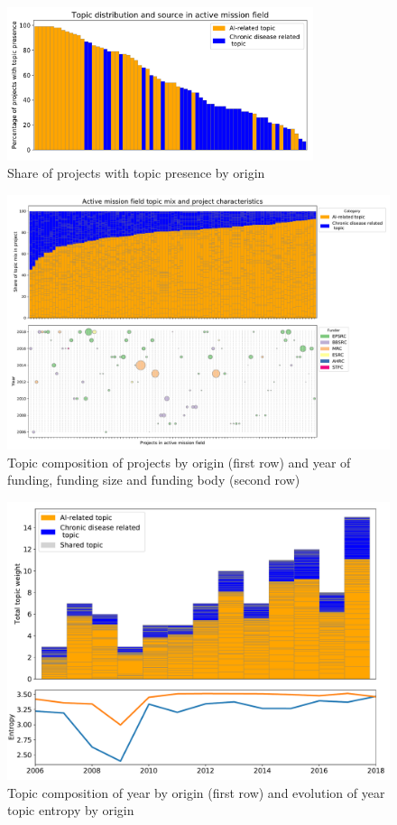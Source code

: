 \documentclass[11pt]{article}
\begin{document}
\begin{figure}[!ht]
    \centering
    \includegraphics[width=0.8\textwidth]{figures/fig_18_distr.pdf}
    \caption{Share of projects with topic presence by origin}
    \label{fig:topic_distr}
\end{figure}

\begin{figure}[!ht]
    \centering
    \includegraphics[width=\textwidth]{figures/fig_19_proj_distr.pdf}
    \caption{Topic composition of projects by origin (first row) and year of funding, funding size and funding body (second row)}
    \label{fig:topic_comp}
\end{figure}

\begin{figure}[!ht]
    \centering
    \includegraphics[width=\textwidth]{figures/fig_20_topic_trends.pdf}
    \caption{Topic composition of year by origin (first row) and evolution of year topic entropy by origin}
    \label{fig:topic_evol}
\end{figure}
\end{document}
